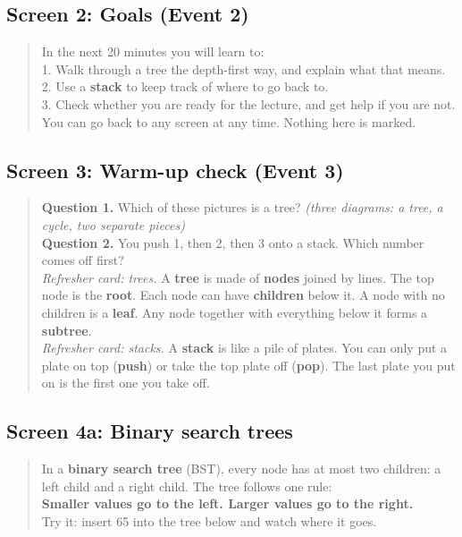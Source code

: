 \documentclass[11pt,a4paper]{article}
\begin{document}
\subsection*{Screen 2: Goals (Event 2)}
\begin{quote}\sffamily\small
In the next 20 minutes you will learn to:\\
1. Walk through a tree the depth-first way, and explain what that means.\\
2. Use a \textbf{stack} to keep track of where to go back to.\\
3. Check whether you are ready for the lecture, and get help if you are not.\\[4pt]
You can go back to any screen at any time. Nothing here is marked.
\end{quote}

\subsection*{Screen 3: Warm-up check (Event 3)}
\begin{quote}\sffamily\small
\textbf{Question 1.} Which of these pictures is a tree? \emph{(three diagrams: a tree, a cycle,
two separate pieces)}\\
\textbf{Question 2.} You push 1, then 2, then 3 onto a stack. Which number comes off first?\\[4pt]
\emph{Refresher card: trees.} A \textbf{tree} is made of \textbf{nodes} joined by lines. The top node
is the \textbf{root}. Each node can have \textbf{children} below it. A node with no children is a
\textbf{leaf}. Any node together with everything below it forms a \textbf{subtree}.\\[4pt]
\emph{Refresher card: stacks.} A \textbf{stack} is like a pile of plates. You can only put a plate on
top (\textbf{push}) or take the top plate off (\textbf{pop}). The last plate you put on is the first
one you take off.
\end{quote}

\subsection*{Screen 4a: Binary search trees}
\begin{quote}\sffamily\small
In a \textbf{binary search tree} (BST), every node has at most two children: a left child and a
right child. The tree follows one rule:\\[2pt]
\textbf{Smaller values go to the left. Larger values go to the right.}\\[2pt]
Try it: insert 65 into the tree below and watch where it goes.
\end{quote}
\end{document}
